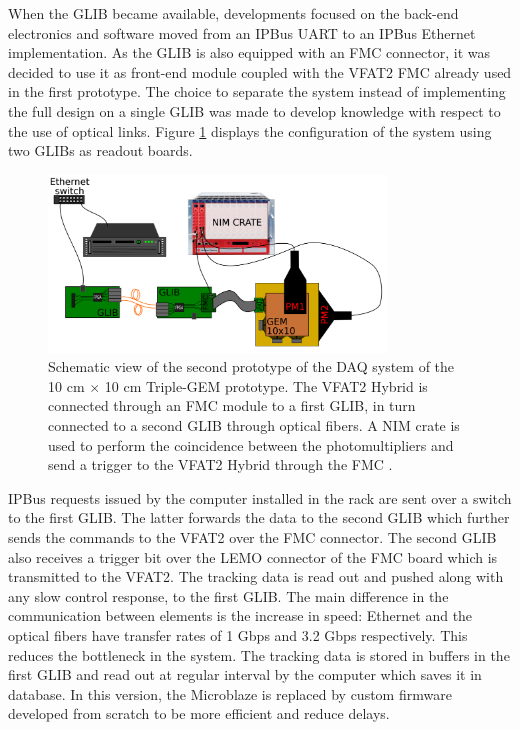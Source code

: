     When the GLIB became available, developments focused on the back-end electronics and software moved from an IPBus UART to an IPBus Ethernet implementation. As the GLIB is also equipped with an FMC connector, it was decided to use it as front-end module coupled with the VFAT2 FMC already used in the first prototype. The choice to separate the system instead of implementing the full design on a single GLIB was made to develop knowledge with respect to the use of optical links. Figure \ref{fig:III-1-sys-2} displays the configuration of the system using two GLIBs as readout boards. \\

    \begin{figure}[h!]
      \centering
      \includegraphics[width=0.8\textwidth]{img/III-1-arch/sys_2.png}
      \caption{Schematic view of the second prototype of the DAQ system of the 10 cm $ \times $ 10 cm Triple-GEM prototype. The VFAT2 Hybrid is connected through an FMC module to a first GLIB, in turn connected to a second GLIB through optical fibers. A NIM crate is used to perform the coincidence between the photomultipliers and send a trigger to the VFAT2 Hybrid through the FMC \cite{Leonard:2065693}.}
      \label{fig:III-1-sys-2}
    \end{figure}

    IPBus requests issued by the computer installed in the rack are sent over a switch to the first GLIB. The latter forwards the data to the second GLIB which further sends the commands to the VFAT2 over the FMC connector. The second GLIB also receives a trigger bit over the LEMO connector of the FMC board which is transmitted to the VFAT2. The tracking data is read out and pushed along with any slow control response, to the first GLIB. The main difference in the communication between elements is the increase in speed: Ethernet and the optical fibers have transfer rates of 1 Gbps and 3.2 Gbps respectively. This reduces the bottleneck in the system. The tracking data is stored in buffers in the first GLIB and read out at regular interval by the computer which saves it in database. In this version, the Microblaze is replaced by custom firmware developed from scratch to be more efficient and reduce delays.

